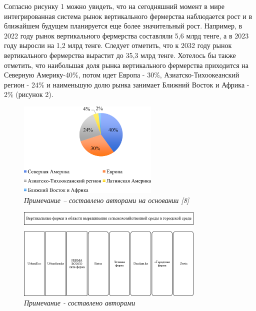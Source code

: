 \begin{multicols}{2}
Согласно рисунку 1 можно увидеть, что на сегодняшний момент в мире
интегрированная система рынок вертикального фермерства наблюдается рост
и в ближайшем будущем планируется еще более значительный рост. Например,
в 2022 году рынок вертикального фермерства составляли 5,6 млрд тенге, а
в 2023 году выросли на 1,2 млрд тенге. Следует отметить, что к 2032 году
рынок вертикального фермерства вырастит до 35,3 млрд тенге. Хотелось бы
также отметить, что наибольшая доля рынка вертикального фермерства
приходится на Северную Америку-40\%, потом идет Европа - 30\%,
Азиатско-Тихоокеанский регион - 24\% и наименьшую долю рынка занимает
Ближний Восток и Африка - 2\% (рисунок 2).
\end{multicols}

\begin{figure}[H]
	\centering
	\includegraphics[width=0.6\textwidth]{media/ekon4/image11}
	\caption*{Рис.2 - Мировая доля рынка вертикального фермерство, млрд долларов США}
	\caption*{\normalfont\emph{Примечание -- составлено авторами на основании {[}8{]}}}
\end{figure}

\begin{figure}[H]
	\centering
	\includegraphics[width=0.8\textwidth]{media/ekon4/image22}
	\caption*{Рис.3 - Примеры интегрированных систем вертикальных ферм в области выращивания сельскохозяйственной среды в городской среде в Казахстане}
	\caption*{\normalfont\emph{Примечание - составлено авторами}}
\end{figure}

